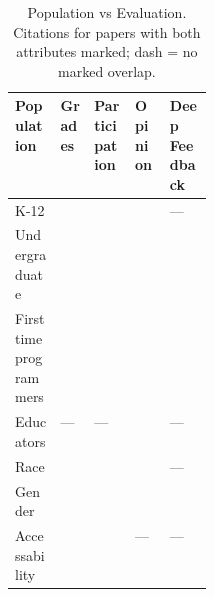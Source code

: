 \begin{table}[!htbp]
\centering
\small
\setlength{\tabcolsep}{4pt}
\renewcommand{\arraystretch}{1.3}
\caption{Population vs Evaluation. Citations for papers with both attributes marked; dash = no marked overlap.}
\begin{tabularx}{\linewidth}{|>{\raggedright\arraybackslash}p{0.23\linewidth}|>{\centering\arraybackslash}X|>{\centering\arraybackslash}X|>{\centering\arraybackslash}X|>{\centering\arraybackslash}X|}
\hline
\textbf{Population} & \textbf{\hspace{0pt}Grades} & \textbf{\hspace{0pt}Participation} & \textbf{\hspace{0pt}Opinion} & \textbf{\hspace{0pt}Deep Feedback} \\ \hline
K-12 & \cite{anon2020title10} \cite{anon2020title32} \cite{anon2020title35} \cite{anon2020title8} & \cite{anon2020title22} & \cite{anon2020title37} \cite{anon2020title8} & --- \\ \hline
Undergraduate & \cite{anon2020title12} \cite{anon2020title19} \cite{anon2020title42} \cite{anon2020title48} & \cite{anon2020title12} \cite{anon2020title15} \cite{anon2020title45} \cite{anon2020title7} & \cite{anon2020title17} \cite{anon2020title25} \cite{anon2020title28} \cite{anon2020title3} \cite{anon2020title42} \cite{anon2020title45} & \cite{anon2020title17} \cite{anon2020title25} \cite{anon2020title28} \cite{anon2020title45} \\ \hline
First time programmers & \cite{anon2020title12} \cite{anon2020title48} & \cite{anon2020title12} \cite{anon2020title15} \cite{anon2020title45} \cite{anon2020title7} & \cite{anon2020title17} \cite{anon2020title45} & \cite{anon2020title17} \cite{anon2020title45} \\ \hline
Educators & --- & --- & \cite{anon2020title37} & --- \\ \hline
Race & \cite{anon2020title32} \cite{anon2020title8} & \cite{anon2020title15} & \cite{anon2020title8} & --- \\ \hline
Gender & \cite{anon2020title35} \cite{anon2020title42} & \cite{anon2020title15} \cite{anon2020title45} \cite{anon2020title7} & \cite{anon2020title3} \cite{anon2020title42} \cite{anon2020title45} & \cite{anon2020title45} \\ \hline
Accessability & \cite{anon2020title48} & \cite{anon2020title22} & --- & --- \\ \hline
\end{tabularx}
\end{table}

